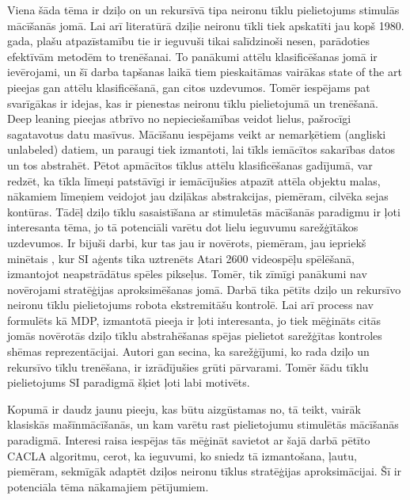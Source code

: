 \documentclass{ludis} %
\begin{document}
Viena šāda tēma ir dziļo on un rekursīvā tipa neironu tīklu pielietojums stimulās mācīšanās jomā.
Lai arī literatūrā dziļie neironu tīkli tiek apskatīti jau kopš 1980. gada, plašu atpazīstamību tie ir ieguvuši tikai salīdzinoši nesen, parādoties efektīvām metodēm to trenēšanai.
To panākumi attēlu klasificēšanas jomā ir ievērojami, un šī darba tapšanas laikā tiem pieskaitāmas vairākas state of the art pieejas gan attēlu klasificēšanā, gan citos uzdevumos.
Tomēr iespējams pat svarīgākas ir idejas, kas ir pienestas neironu tīklu pielietojumā un trenēšanā.
Deep leaning pieejas atbrīvo no nepieciešamības veidot lielus, pašrocīgi sagatavotus datu masīvus.
Mācīšanu iespējams veikt ar nemarķētiem (angliski unlabeled) datiem, un paraugi tiek izmantoti, lai tīkls iemācītos sakarības datos un tos abstrahēt.
Pētot apmācītos tīklus attēlu klasificēšanas gadījumā, var redzēt, ka tīkla līmeņi patstāvīgi ir iemācījušies atpazīt attēla objektu malas, nākamiem līmeņiem veidojot jau dziļākas abstrakcijas, piemēram, cilvēka sejas kontūras.
Tādēļ dziļo tīklu sasaistīšana ar stimuletās mācīšanās paradigmu ir ļoti interesanta tēma, jo tā potenciāli varētu dot lielu ieguvumu sarežģītākos uzdevumos.
Ir bijuši darbi, kur tas jau ir novērots, piemēram, jau iepriekš minētais \autocite{mnih2013playing}, kur SI aģents tika uztrenēts Atari 2600 videospēļu spēlēšanā, izmantojot neapstrādātus spēles pikseļus.
Tomēr, tik zīmīgi panākumi nav novērojami stratēģijas aproksimēšanas jomā.
Darbā \autocite{Levine2013} tika pētīts dziļo un rekursīvo neironu tīklu pielietojums robota ekstremitāšu kontrolē.
Lai arī process nav formulēts kā MDP, izmantotā pieeja ir ļoti interesanta, jo tiek mēģināts citās jomās novērotās dziļo tīklu abstrahēšanas spējas pielietot sarežģītas kontroles shēmas reprezentācijai.
Autori gan secina, ka sarežģījumi, ko rada dziļo un rekursīvo tīklu trenēšana, ir izrādījušies grūti pārvarami.
Tomēr šādu tīklu pielietojums SI paradigmā šķiet ļoti labi motivēts.

Kopumā ir daudz jaunu pieeju, kas būtu aizgūstamas no, tā teikt, vairāk klasiskās mašīnmācīšanās, un kam varētu rast pielietojumu stimulētās mācīšanās paradigmā.
Interesi raisa iespējas tās mēģināt savietot ar šajā darbā pētīto CACLA algoritmu, cerot, ka ieguvumi, ko sniedz tā izmantošana, ļautu, piemēram, sekmīgāk adaptēt dziļos neironu tīklus stratēģijas aproksimācijai.
Šī ir potenciāla tēma nākamajiem pētījumiem.



\end{document}

